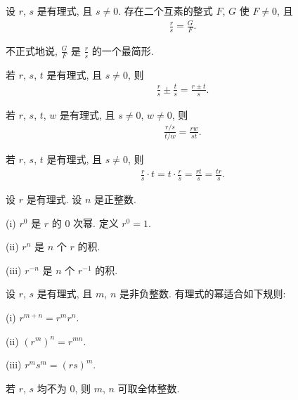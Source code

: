 \begin{proposition}
    设 $r$, $s$ 是有理式, 且 $s \neq 0$. 存在二个互素的整式 $F$, $G$ 使 $F \neq 0$, 且
    \begin{align*}
        \frac{r}{s} = \frac{G}{F}.
    \end{align*}
\end{proposition}

\begin{remark}
    不正式地说, $\frac{G}{F}$ 是 $\frac{r}{s}$ 的一个最简形.
\end{remark}

\begin{proposition}
    若 $r$, $s$, $t$ 是有理式, 且 $s \neq 0$, 则
    \begin{align*}
        \frac{r}{s} \pm \frac{t}{s} = \frac{r \pm t}{s}.
    \end{align*}
\end{proposition}

\begin{proposition}
    若 $r$, $s$, $t$, $w$ 是有理式, 且 $s \neq 0$, $w \neq 0$, 则
    \begin{align*}
        \frac{r/s}{t/w} = \frac{rw}{st}.
    \end{align*}
\end{proposition}

\begin{proposition}
    若 $r$, $s$, $t$ 是有理式, 且 $s \neq 0$, 则
    \begin{align*}
        \frac{r}{s} \cdot t = t \cdot \frac{r}{s} = \frac{rt}{s} = \frac{tr}{s}.
    \end{align*}
\end{proposition}

\begin{definition}
    设 $r$ 是有理式. 设 $n$ 是正整数.

    (i) $r^0$ 是 $r$ 的 $0$ 次幂. 定义 $r^0 = 1$.

    (ii) $r^n$ 是 $n$ 个 $r$ 的积.

    (iii) $r^{-n}$ 是 $n$ 个 $r^{-1}$ 的积.
\end{definition}

\begin{proposition}
    设 $r$, $s$ 是有理式, 且 $m$, $n$ 是非负整数. 有理式的幂适合如下规则:

    (i) $r^{m+n} = r^m r^n$.

    (ii) $(r^m)^n = r^{mn}$.

    (iii) $r^m s^m = (rs)^m$.

    若 $r$, $s$ 均不为 $0$, 则 $m$, $n$ 可取全体整数.
\end{proposition}


